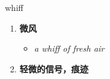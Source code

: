 
\begin{frame}
{\huge whiff}
\begin{center}
\begin{enumerate}\Large
  \item \textbf{微风}
  \begin{itemize}
    \item \em{\Large{a whiff of fresh air}}
  \end{itemize}
  \item \textbf{轻微的信号，痕迹}
\end{enumerate}
\end{center}
\end{frame}
